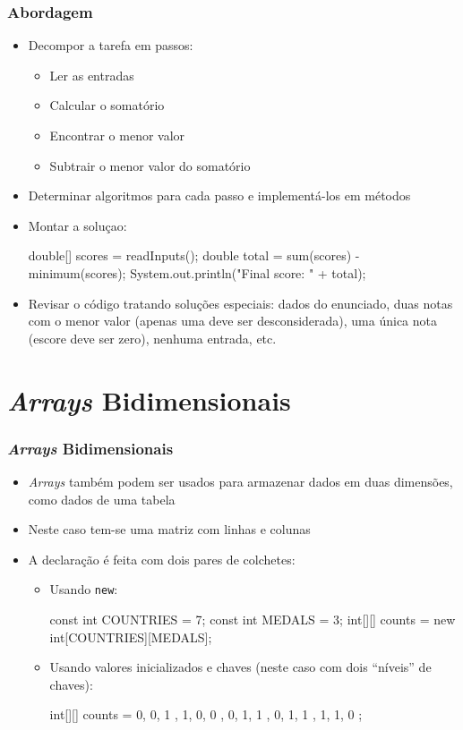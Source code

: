 \documentclass[xcolor={dvipsnames,table},aspectratio=169]{beamer}
\begin{document}
\begin{frame}[fragile]\frametitle{Abordagem}
\begin{itemize}
	\item Decompor a tarefa em passos:
	\begin{itemize}
		\item Ler as entradas
		\item Calcular o somatório
		\item Encontrar o menor valor
		\item Subtrair o menor valor do somatório
	\end{itemize}
	\item Determinar algoritmos para cada passo e implementá-los em métodos
	\item Montar a soluçao:
{\scriptsize
\begin{javacode}
double[] scores = readInputs();
double total = sum(scores) - minimum(scores);
System.out.println("Final score: " + total);
\end{javacode}
}
	\item Revisar o código tratando soluções especiais: dados do enunciado, duas notas com o menor valor (apenas uma deve ser desconsiderada), uma única nota (escore deve ser zero), nenhuma entrada, etc.
\end{itemize}
\end{frame}

\section{\emph{Arrays} Bidimensionais}

\begin{frame}[fragile]\frametitle{\emph{Arrays} Bidimensionais}
\begin{itemize}
	\item \emph{Arrays} também podem ser usados para armazenar dados em duas dimensões, como dados de uma tabela
	\item Neste caso tem-se uma matriz com linhas e colunas
	\item A declaração é feita com dois pares de colchetes:
	\begin{itemize}
		\item Usando \texttt{new}:
{\scriptsize
\begin{javacode}
const int COUNTRIES = 7;
const int MEDALS = 3;
int[][] counts = new int[COUNTRIES][MEDALS];
\end{javacode}
}
		\item Usando valores inicializados e chaves (neste caso com dois ``níveis'' de chaves):
{\scriptsize
\begin{javacode}
int[][] counts = {
  { 0, 0, 1 },
  { 1, 0, 0 },
  { 0, 1, 1 },
  { 0, 1, 1 },
  { 1, 1, 0 }
};
\end{javacode}
}
	\end{itemize}
\end{itemize}
\end{frame}
\end{document}
